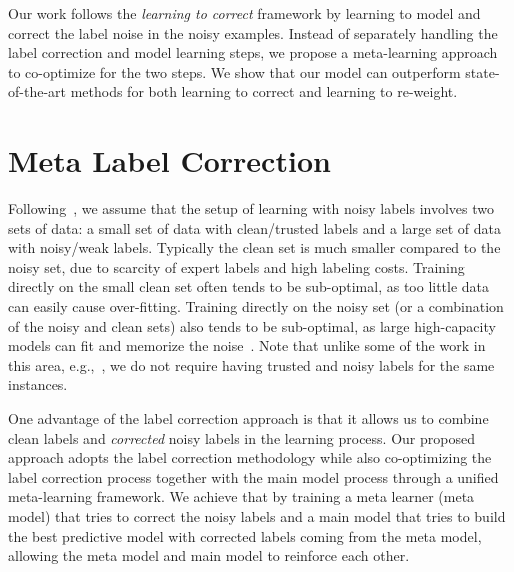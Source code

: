Our work follows the \emph{learning to correct} framework by learning
to model and correct the label noise in the noisy examples. Instead of
separately handling the label correction and model learning steps, we
propose a meta-learning approach to co-optimize for the two steps. We
show that our model can outperform state-of-the-art methods for both
learning to correct and learning to re-weight.

\section{Meta Label Correction}
\label{sec:model}

Following~\cite{charikar2017learning, veit2017learning, Li_2017_ICCV, xiao2015learning, ren2018learning}, we assume that the setup of learning with noisy
labels involves two sets of data: a small set of data with
clean/trusted labels and a large set of data with noisy/weak
labels. Typically the clean set is much smaller compared to the noisy
set, due to scarcity of expert labels and high labeling costs. Training
directly on the small clean set often tends to be sub-optimal, as too
little data can easily cause over-fitting. Training directly on the
noisy set (or a combination of the noisy and clean sets) also tends to
be sub-optimal, as large high-capacity models can fit and memorize the
noise~\cite{zhang2016understanding}. Note that unlike some of the work in this area, e.g.,~\cite{veit2017learning}, we do not require having trusted and noisy labels for the same instances.

One advantage of the label correction approach is that it allows us to combine clean labels and \emph{corrected} noisy labels in the learning process. Our proposed approach adopts the label correction methodology
while also co-optimizing the label correction process together with the main model process through a unified meta-learning framework. We
achieve that by training a meta learner (meta model) that tries to correct the noisy labels and a main 
model that tries to build the best predictive model with corrected labels
coming from the meta model, allowing the meta model and main model to reinforce each other.

